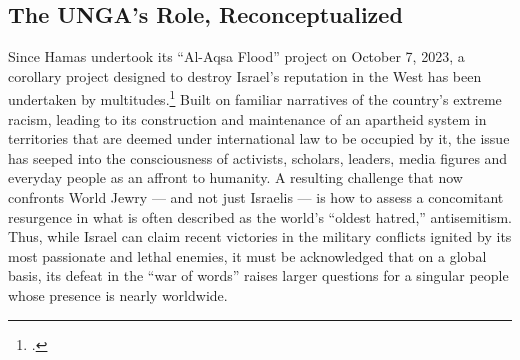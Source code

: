 \documentclass[../unravbook.tex]{subfiles}
\begin{document}
\begin{spacing}{1.2}


\setcounter{chapter}{0}
\chapter{The UNGA's Role, Reconceptualized} %

Since Hamas undertook its \enquote{Al-Aqsa Flood} project on October 7, 2023, a corollary project designed to destroy Israel's reputation in the West has been undertaken by multitudes.\footcite[In this paper, the \enquote{West} is meant to connote western European and other societies whose influence and power expanded transcontinentally due to the successes of their eighteenth and nineteenth century era of imperialisms. In recent decades, these societies have often been characterized as having imposed their geopolitical will on \enquote{eastern} societies that were inadequately prepared to defend themselves against Western military, industrial and cultural aggressions, which enabled their long successful practice of \enquote{Orientalism.} In Edward Said's words, \enquote{what the early Orientalist achieved, and what the non-Orientalist in the West exploited, was a reduced model of the Orient suitable for the prevailing, dominant culture and its theoretical (and hard after the theoretical, the practical) exigencies.}][153]{Said-1978a} Built on familiar narratives of the country's extreme racism, leading to its construction and maintenance of an apartheid system in territories that are deemed under international law to be occupied by it, the issue has seeped into the consciousness of activists, scholars, leaders, media figures and everyday people as an affront to humanity. A resulting challenge that now confronts World Jewry --- and not just Israelis --- is how to assess a concomitant resurgence in what is often described as the world's \enquote{oldest hatred,} antisemitism. Thus, while Israel can claim recent victories in the military conflicts ignited by its most passionate and lethal enemies, it must be acknowledged that on a global basis, its defeat in the \enquote{war of words} \parencite{Qutami-2020} raises larger questions for a singular people whose presence is nearly worldwide. 


\end{spacing}
\end{document}
